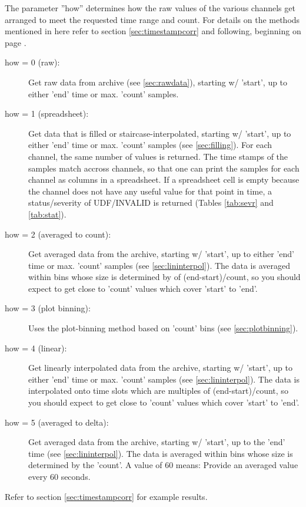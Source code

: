 \noindent The parameter ''how'' determines how the raw values of the
various channels get arranged to meet the requested time range and
count.  For details on the methods mentioned in here refer to section
\ref{sec:timestampcorr} and following, beginning on page
\pageref{sec:timestampcorr}.
\begin{description}
\item[\sffamily how = 0 (raw):]
  Get raw data from archive (see \ref{sec:rawdata}), starting w/ 'start',
  up to either 'end' time or max. 'count' samples.
\item[\sffamily how = 1 (spreadsheet):]
  Get data that is filled or staircase-interpolated, starting
  w/ 'start', up to either 'end' time or max. 'count' samples
  (see \ref{sec:filling}).
  For each channel, the same number of values is returned. The
  time stamps of the samples match accross channels, so that one can
  print the samples for each channel as columns in a spreadsheet.
  If a spreadsheet cell is empty because the channel does not have any
  useful value for that point in time, a status/severity of
  UDF/INVALID is returned (Tables \ref{tab:sevr} and \ref{tab:stat}).
\item[\sffamily how = 2 (averaged to count):]
  Get averaged data from the archive, starting w/ 'start',
  up to either 'end' time or max. 'count' samples
  (see \ref{sec:lininterpol}).
  The data is averaged within bins whose size is determined by 
  of (end-start)/count, so you should expect to get close to 'count'
  values which cover 'start' to 'end'.
\item[\sffamily how = 3 (plot binning):]
  Uses the plot-binning method based on 'count' bins
  (see \ref{sec:plotbinning}).
\item[\sffamily how = 4 (linear):]
  Get linearly interpolated data from the archive, starting w/ 'start',
  up to either 'end' time or max. 'count' samples
  (see \ref{sec:lininterpol}).
  The data is interpolated onto time slots which are multiples
  of (end-start)/count, so you should expect to get close to 'count'
  values which cover 'start' to 'end'.
\item[\sffamily how = 5 (averaged to delta):]
  Get averaged data from the archive, starting w/ 'start',
  up to the 'end' time (see \ref{sec:lininterpol}).
  The data is averaged within bins whose size is determined by 
  the 'count'. A value of 60 means: Provide an averaged value every 60 seconds.
\end{description}
Refer to section \ref{sec:timestampcorr} for example results.

